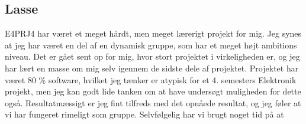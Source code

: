 \subsection{Lasse} 

E4PRJ4 har været et meget hårdt, men meget lærerigt projekt for mig. Jeg synes at jeg har været en del af en dynamisk gruppe, som har et meget højt ambitions niveau. Det er gået sent op for mig, hvor stort projektet i virkeligheden er, og jeg har lært en masse om mig selv igennem de sidste dele af projektet. Projektet har været 80 \% software, hvilket jeg tænker er atypisk for et 4. semesters Elektronik projekt, men jeg kan godt lide tanken om at have undersøgt muligheden for dette også. Resultatmæssigt er jeg fint tilfreds med det opnåede resultat, og jeg føler at vi har fungeret rimeligt som gruppe. Selvfølgelig har vi brugt noget tid på at 